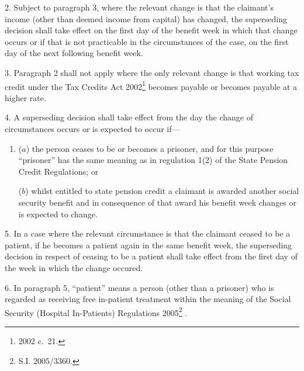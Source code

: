\documentclass[12pt,a4paper]{article}
\begin{document}
\medskip

2.  Subject to paragraph 3, where the relevant change is that the claimant’s income (other than deemed income from capital) has changed, the superseding decision shall take effect on the first day of the benefit week in which that change occurs or if that is not practicable in the circumstances of the case, on the first day of the next following benefit week.

\medskip

3.  Paragraph 2 shall not apply where the only relevant change is that working tax credit under the Tax Credits Act 2002\footnote{2002 c.\ 21.} becomes payable or becomes payable at a higher rate.

\medskip

4.  A superseding decision shall take effect from the day the change of circumstances occurs or is expected to occur if—
\begin{enumerate}\item[]
($a$) the person ceases to be or becomes a prisoner, and for this purpose “prisoner” has the same meaning as in regulation 1(2) of the State Pension Credit Regulations; or

($b$) whilst entitled to state pension credit a claimant is awarded another social security benefit and in consequence of that award his benefit week changes or is expected to change.
\end{enumerate}

\medskip


5.  In a case where the relevant circumstance is that the claimant ceased to be a patient, if he becomes a patient again in the same benefit week, the superseding decision in respect of ceasing to be a patient shall take effect from the first day of the week in which the change occured.


\medskip

6.  In paragraph 5, “patient” means a person (other than a prisoner) who is regarded as receiving free in-patient treatment within the meaning of the 
Social Security (Hospital In-Patients) Regulations 2005\footnote{S.I. 2005/3360.}%
.
\end{document}

